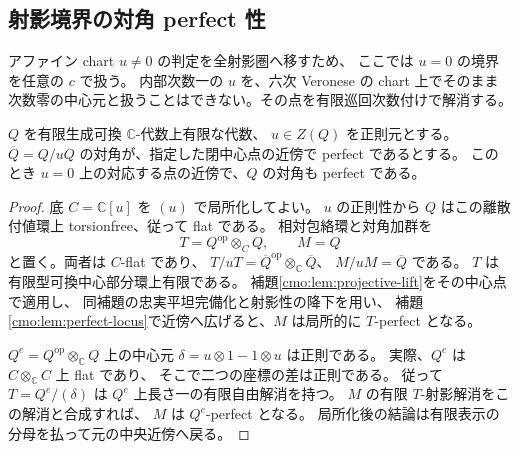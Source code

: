 \subsection{射影境界の対角 perfect 性}

アファイン chart $u\ne0$ の判定を全射影圏へ移すため、
ここでは $u=0$ の境界を任意の $c$ で扱う。
内部次数一の $u$ を、六次 Veronese の chart 上でそのまま
次数零の中心元と扱うことはできない。その点を有限巡回次数付けで解消する。

\begin{lemma}
\label{cmo:lem:central-smooth-lift}
$Q$ を有限生成可換 $\mathbb C$-代数上有限な代数、
$u\in Z(Q)$ を正則元とする。
$\overline Q=Q/uQ$ の対角が、指定した閉中心点の近傍で perfect であるとする。
このとき $u=0$ 上の対応する点の近傍で、$Q$ の対角も perfect である。
\end{lemma}
\begin{proof}
底 $C=\mathbb C[u]$ を $(u)$ で局所化してよい。
$u$ の正則性から $Q$ はこの離散付値環上 torsionfree、従って flat である。
相対包絡環と対角加群を
\[
 T=Q^{\mathrm{op}}\otimes_C Q,\qquad M=Q
\]
と置く。両者は $C$-flat であり、
$T/uT=\overline Q^{\mathrm{op}}\otimes_{\mathbb C}\overline Q$、
$M/uM=\overline Q$ である。
$T$ は有限型可換中心部分環上有限である。
補題\ref{cmo:lem:projective-lift}をその中心点で適用し、
同補題の忠実平坦完備化と射影性の降下を用い、
補題\ref{cmo:lem:perfect-locus}で近傍へ広げると、$M$ は局所的に $T$-perfect となる。

$Q^e=Q^{\mathrm{op}}\otimes_{\mathbb C}Q$ 上の中心元
$\delta=u\otimes1-1\otimes u$ は正則である。
実際、$Q^e$ は $C\otimes_{\mathbb C}C$ 上 flat であり、
そこで二つの座標の差は正則である。
従って $T=Q^e/(\delta)$ は $Q^e$ 上長さ一の有限自由解消を持つ。
$M$ の有限 $T$-射影解消をこの解消と合成すれば、
$M$ は $Q^e$-perfect となる。
局所化後の結論は有限表示の分母を払って元の中央近傍へ戻る。
\end{proof}

